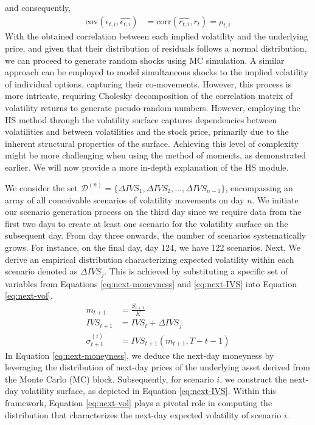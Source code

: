 and consequently,
\begin{align}
    \text{cov}(\epsilon_{t, i}, \widehat{\epsilon_{t, i}}) &= \text{corr}(\widehat{r_{t, i}}, r_t) = \rho_{t,i}
\end{align}
With the obtained correlation between each implied volatility and the underlying price, and given that their distribution of residuals follows a normal distribution, we can proceed to generate random shocks using MC simulation. A similar approach can be employed to model simultaneous shocks to the implied volatility of individual options, capturing their co-movements. However, this process is more intricate, requiring Cholesky decomposition of the correlation matrix of volatility returns to generate pseudo-random numbers. However, employing the HS method through the volatility surface captures dependencies between volatilities and between volatilities and the stock price, primarily due to the inherent structural properties of the surface. Achieving this level of complexity might be more challenging when using the method of moments, as demonstrated earlier. We will now provide a more in-depth explanation of the HS module.

We consider the set $\mathcal{D}^{(n)} = \{\Delta \textit{IVS}_1, \Delta \textit{IVS}_2, \ldots, \Delta \textit{IVS}_{n-1}\}$, encompassing an array of all conceivable scenarios of volatility movements on day $n$. We initiate our scenario generation process on the third day since we require data from the first two days to create at least one scenario for the volatility surface on the subsequent day. From day three onwards, the number of scenarios systematically grows. For instance, on the final day, day 124, we have 122 scenarios. Next, We derive an empirical distribution characterizing expected volatility within each scenario denoted as $\Delta \textit{IVS}_j$. This is achieved by substituting a specific set of variables from Equations \eqref{eq:next-moneyness} and \eqref{eq:next-IVS} into Equation \eqref{eq:next-vol}.
\begin{align}
    m_{t+1} &= \frac{S_{t+1}}{K} \label{eq:next-moneyness}\\
    \textit{IVS}_{t+1} &= \textit{IVS}_t + \Delta \textit{IVS}_j \label{eq:next-IVS}\\
    \sigma_{t+1}^{(i)} &= \textit{IVS}_{t+1}(m_{t+1}, T-t-1) \label{eq:next-vol}
\end{align}
In Equation \eqref{eq:next-moneyness}, we deduce the next-day moneyness by leveraging the distribution of next-day prices of the underlying asset derived from the Monte Carlo (MC) block. Subsequently, for scenario $i$, we construct the next-day volatility surface, as depicted in Equation \eqref{eq:next-IVS}. Within this framework, Equation \eqref{eq:next-vol} plays a pivotal role in computing the distribution that characterizes the next-day expected volatility of scenario $i$.

